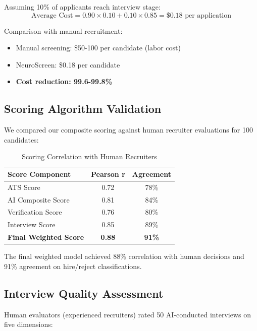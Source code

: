 \documentclass[conference]{IEEEtran}
\begin{document}
Assuming 10\% of applicants reach interview stage:
\begin{equation}
\text{Average Cost} = 0.90 \times 0.10 + 0.10 \times 0.85 = \$0.18 \text{ per application}
\end{equation}

Comparison with manual recruitment:
\begin{itemize}
    \item Manual screening: \$50-100 per candidate (labor cost)
    \item NeuroScreen: \$0.18 per candidate
    \item \textbf{Cost reduction: 99.6-99.8\%}
\end{itemize}

\subsection{Scoring Algorithm Validation}

We compared our composite scoring against human recruiter evaluations for 100 candidates:

\begin{table}[h]
\centering
\caption{Scoring Correlation with Human Recruiters}
\label{tab:scoring_correlation}
\begin{tabular}{@{}lcc@{}}
\toprule
\textbf{Score Component} & \textbf{Pearson r} & \textbf{Agreement} \\ \midrule
ATS Score & 0.72 & 78\% \\
AI Composite Score & 0.81 & 84\% \\
Verification Score & 0.76 & 80\% \\
Interview Score & 0.85 & 89\% \\ \midrule
\textbf{Final Weighted Score} & \textbf{0.88} & \textbf{91\%} \\ \bottomrule
\end{tabular}
\end{table}

The final weighted model achieved 88\% correlation with human decisions and 91\% agreement on hire/reject classifications.

\subsection{Interview Quality Assessment}

Human evaluators (experienced recruiters) rated 50 AI-conducted interviews on five dimensions:
\end{document}
